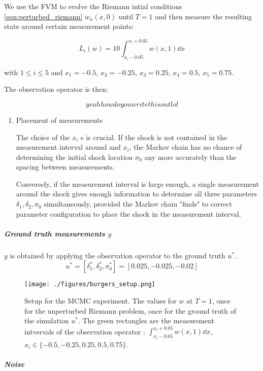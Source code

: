 \documentclass[11pt]{article}
\begin{document}
We use the FVM to evolve the Riemann intial conditions \ref{eqn:perturbed_riemann} \(w_u(x, 0)\)
until \(T=1\) and then measure the resulting state around certain measurement points:

\begin{equation}
L_i(w) = 10 \int_{x_i - 0.05}^{x_i + 0.05} w(x, 1) \dd x
\end{equation}

with \(1 \leq i \leq 5\) and \(x_1 = -0.5\), \(x_2= -0.25\), \(x_3 = 0.25\), \(x_4 = 0.5\), \(x_5 = 0.75\).

The observation operator is then:

$$yeah how do you write this out lol$$

\begin{enumerate}
\item Placement of measurements
\label{sec:org262661d}

The choice of the \(x_i\) s is crucial. If the shock is not contained in the measurement
interval around and \(x_i\), the Markov chain has no chance of determining the initial
shock location \(\sigma_0\) any more accurately than the spacing between measurements.

Conversely, if the measurement interval is large enough, a single measurement around the
shock gives enough information to determine all three parameters \(\delta_1, \delta_2, \sigma_0\)
simultaneously, provided the Markov chain "finds" to correct parameter configuration to place the
shock in the measurement interval.
\end{enumerate}

\subparagraph{Ground truth measurements \(y\)}
\label{sec:org407bcc4}

\(y\) is obtained by applying the observation operator to the ground truth \(u^*\).
$$u^* = [\delta_1^*, \delta_2^*, \sigma_0^*] = [0.025, -0.025, -0.02]$$

\begin{figure}[htbp]
\centering
\texttt{[image: ./figures/burgers\_setup.png]}
\caption{\label{fig:burgers_setup}
Setup for the MCMC experiment. The values for \(w\) at \(T=1\), once for the unperturbed Riemann problem, once for the ground truth of the simulation \(u^*\). The green rectangles are the measurement intvervals of the observation operator : \(\int_{x_i - 0.05}^{x_i + 0.05} w(x,1)\dd x\), \(x_i \in \{ -0.5, -0.25, 0.25, 0.5, 0.75 \}\).}
\end{figure}

\subparagraph{Noise}
\label{sec:org8bee14e}
\end{document}
